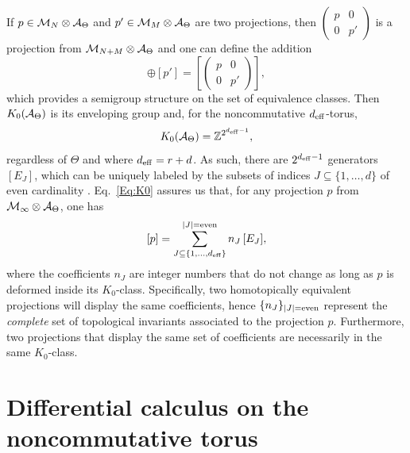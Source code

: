 \documentclass[
    10pt,
    aps,
    prb,
	longbibliography,
    twocolumn,
    floatfix,
    superscriptaddress,
]{revtex4-2}
\begin{document}
If $p \in {\mathcal M}_N \otimes {\mathcal A}_\Theta$ and $p' \in {\mathcal M}_M \otimes {\mathcal A}_\Theta$ are two projections, then $\begin{pmatrix} p & 0 \\ 0 & p' \end{pmatrix}$ is a projection from ${\mathcal M}_{N+M} \otimes {\mathcal A}_\Theta$ and one can define the addition
\begin{equation}
[p] \oplus [p'] = \left [  \left( \begin{matrix} p & 0 \\ 0 & p' \end{matrix} \right) \right ],
\end{equation}
which provides a semigroup structure on the set of equivalence classes. Then $K_0({\mathcal A}_\Theta)$ is its  enveloping group \cite{Blackadar1998} and, for the noncommutative ${d_\mathrm{eff}}$-torus,
\begin{equation}\label{Eq:K0} 
K_0({\mathcal A}_\Theta) = {\mathbb Z}^{2^{{d_\mathrm{eff}}-1}},
\end{equation}
regardless of $\Theta$ and where ${d_\mathrm{eff}} = r+d$.
As such, there are $2^{{d_\mathrm{eff}}-1}$ generators $[E_J]$, which can be uniquely labeled by the subsets of indices $J \subseteq \{1,\ldots,d\}$ of even cardinality \cite{Prodan2016}. Eq.~\eqref{Eq:K0} assures us that, for any projection $p$ from ${\mathcal M}_\infty \otimes {\mathcal A}_\Theta$, one has
\begin{equation}\label{Eq-GenExpansion}
[p]  = \sum_{J \subseteq \{1,\ldots,{d_\mathrm{eff}} \}}^{|J|={\rm even}} n_J \, [E_J], 
\end{equation} 
where the coefficients $n_J$ are integer numbers that do not change as long as $p$ is deformed inside its $K_0$-class. 
Specifically, two homotopically equivalent projections will display the same coefficients, hence $\{n_J\}_{|J|={\rm even}}$ represent the {\it complete} set of topological invariants associated to the projection $p$. 
Furthermore, two projections that display the same set of coefficients are necessarily in the same $K_0$-class. 

\section{Differential calculus on the noncommutative torus}
\label{app:differential_calculus}
\end{document}
